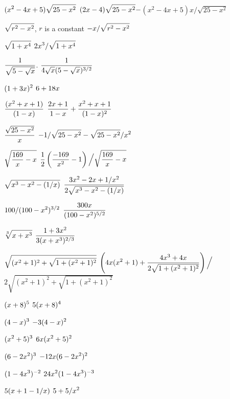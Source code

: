 \exercise $\displaystyle (x^2-4x+5)\sqrt{25-x^2}$
\answer $\displaystyle  (2x-4)\sqrt{25-x^2}-$\hfill\break$(x^2-4x+5)x/\sqrt{25-x^2}$
\endanswer
\endexercise

\exercise $\displaystyle \sqrt{r^2-x^2}$, $r$ is a constant
\answer $\displaystyle -x/\sqrt{r^2-x^2}$
\endanswer
\endexercise

\exercise $\displaystyle \sqrt{1+x^4}$
\answer $\displaystyle 2x^3/\sqrt{1+x^4}$
\endanswer
\endexercise

\exercise $\displaystyle \displaystyle{1\over\sqrt{5-\sqrt{x}}}$.
\answer $\displaystyle{1\over 4\sqrt{x}(5-\sqrt{x})^{3/2}}$
\endanswer
\endexercise

\exercise $\displaystyle (1+3x)^2$
\answer $\displaystyle  6+18x$
\endanswer
\endexercise

\exercise $\displaystyle{(x^2+x+1)\over(1-x)}$
\answer $\displaystyle {2 x + 1\over1 - x }+{x^2  + x + 1\over(1 - x)^2}$
\endanswer
\endexercise

\exercise $\displaystyle{\sqrt{25-x^2}\over x}$
\answer $\displaystyle  -1/\sqrt{25-x^2}-\sqrt{25-x^2}/x^2$
\endanswer
\endexercise

\exercise $\displaystyle\sqrt{{169\over x}-x}$
\answer $\displaystyle{1\over2}\left({-169\over x^2}-1\right)\Big/\sqrt{{169\over x}-x}$
\endanswer
\endexercise

\exercise $\displaystyle \sqrt{x^3-x^2-(1/x)}$
\answer $ \displaystyle{3x^2-2x+1/x^2\over 2\sqrt{x^3-x^2-(1/x)}}$
\endanswer
\endexercise

\exercise $\displaystyle 100/(100-x^2)^{3/2}$
\answer $ \displaystyle{300 x \over(100-x^2)^{5/2}}$
\endanswer
\endexercise

\exercise $\ds {\root 3 \of{x+x^3}}$
\answer $ \displaystyle{ 1 + 3 x^2\over3(x+x^3)^{2/3}}$
\endanswer
\endexercise

\exercise $\displaystyle \sqrt{(x^2+1)^2+\sqrt{1+(x^2+1)^2}}$
\answer $ \displaystyle \left(4x(x^2+1)+{4x^3+4x\over2\sqrt{1+(x^2+1)^2}}\right)\Big/$
\hfill\break$2\sqrt{(x^2+1)^2+\sqrt{1+(x^2+1)^2}}$
\endanswer
\endexercise

\exercise $\displaystyle (x+8)^5$
\answer $\displaystyle 5(x+8)^4$
\endanswer
\endexercise

\exercise $\displaystyle (4-x)^3$
\answer $\displaystyle -3(4-x)^2$
\endanswer
\endexercise

\exercise $\displaystyle (x^2+5)^3$
\answer $\displaystyle 6x(x^2+5)^2$
\endanswer
\endexercise

\exercise $\displaystyle (6-2x^2)^3$
\answer $\displaystyle -12x(6-2x^2)^2$
\endanswer
\endexercise

\exercise $\displaystyle (1-4x^3)^{-2}$
\answer $\displaystyle 24x^2(1-4x^3)^{-3}$
\endanswer
\endexercise

\exercise $\displaystyle 5(x+1-1/x)$
\answer $\displaystyle 5+5/x^2$
\endanswer
\endexercise

